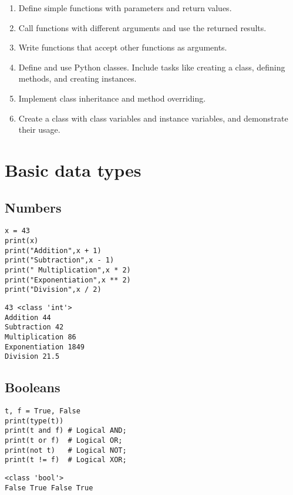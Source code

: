 \begin{enumerate}
    \item Define simple functions with parameters and return values.
    \item Call functions with different arguments and use the returned results.
    \item Write functions that accept other functions as arguments.
    \item Define and use Python classes. Include tasks like creating a class, defining methods, and creating instances.
    \item Implement class inheritance and method overriding.
    \item Create a class with class variables and instance variables, and demonstrate their usage.
\end{enumerate}









\section{Basic data types}
\vspace{-.15cm}
\subsection{Numbers}
\vspace{-.75cm}
\begin{code}
\begin{lstlisting}
x = 43
print(x)
print("Addition",x + 1)   
print("Subtraction",x - 1)   
print(" Multiplication",x * 2)   
print("Exponentiation",x ** 2)  
print("Division",x / 2)  
\end{lstlisting}
\end{code}
\vspace{-1cm}
\begin{verbatim}
43 <class 'int'> 
Addition 44
Subtraction 42
Multiplication 86
Exponentiation 1849
Division 21.5
\end{verbatim}


\vspace{-.6cm}
\subsection{Booleans}
\vspace{-.75cm}
\begin{code}
\begin{lstlisting}
t, f = True, False
print(type(t))
print(t and f) # Logical AND;
print(t or f)  # Logical OR;
print(not t)   # Logical NOT;
print(t != f)  # Logical XOR;
\end{lstlisting}
\end{code}
\vspace{-1cm}
\begin{verbatim}
<class 'bool'>
False True False True
\end{verbatim}

